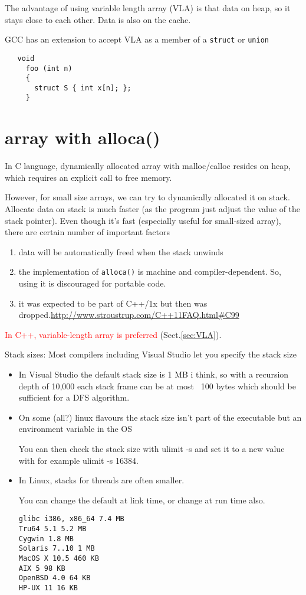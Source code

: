 \begin{framed}
The advantage of using variable length array (VLA) is that data on heap, so it
stays close to each other. Data is also on the cache.
\end{framed}

GCC has an extension to accept VLA as a member of a \verb!struct! or
\verb!union!
\begin{Verbatim}
   void
     foo (int n)
     {
       struct S { int x[n]; };
     }
\end{Verbatim}

\section{array with alloca()}
\label{sec:alloca}


In C language, dynamically allocated array with malloc/calloc resides on heap,
which requires an explicit call to free memory.

However, for small size arrays, we can try to dynamically allocated it on stack.
Allocate data on stack is much faster (as the program just adjust the value
of the stack pointer). Even though it's fast (especially useful for small-sized
array), there are certain number of important factors
\begin{enumerate}
  \item data will be automatically freed when the stack unwinds
  \item the implementation of \verb!alloca()! is machine and compiler-dependent.
  So, using it is discouraged for portable code.
  \item it was expected to be part of C++/1x but then was
  dropped.\url{http://www.stroustrup.com/C++11FAQ.html#C99}
\end{enumerate}
\textcolor{red}{In C++, variable-length array is preferred} (Sect.\ref{sec:VLA}).

Stack sizes: Most compilers including Visual Studio let you specify the stack size
\begin{itemize}

  \item  In Visual Studio the default stack size is 1 MB i think, so with a
  recursion depth of 10,000 each stack frame can be at most ~100 bytes which
  should be sufficient for a DFS algorithm.

  \item On some (all?) linux flavours the stack size isn't part of the
  executable but an environment variable in the OS
  
  You can then check the stack size with ulimit -s and set it to a new value
  with for example ulimit -s 16384.
  
  \item In Linux, stacks for threads are often smaller.
  
  You can change the default at link time, or change at run time also. 
\begin{verbatim}
glibc i386, x86_64 7.4 MB
Tru64 5.1 5.2 MB
Cygwin 1.8 MB
Solaris 7..10 1 MB
MacOS X 10.5 460 KB
AIX 5 98 KB
OpenBSD 4.0 64 KB
HP-UX 11 16 KB
\end{verbatim}
  
\end{itemize}

